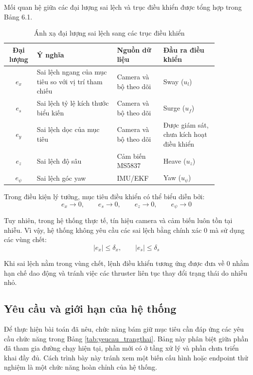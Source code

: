 \documentclass[../DoAn.tex]{subfiles}
\begin{document}
Mối quan hệ giữa các đại lượng sai lệch và trục điều khiển được tổng hợp trong Bảng 6.1.

\begin{table}[htbp]
    \centering
    \caption{Ánh xạ đại lượng sai lệch sang các trục điều khiển}
    \label{tab:anhxa_sailech}
    \renewcommand{\arraystretch}{1.3}
    \begin{tabular}{|c|p{0.38\linewidth}|p{0.22\linewidth}|p{0.26\linewidth}|}
        \hline
        \textbf{Đại lượng} & \textbf{Ý nghĩa} & \textbf{Nguồn dữ liệu} & \textbf{Đầu ra điều khiển} \\
        \hline
        $e_x$ & Sai lệch ngang của mục tiêu so với vị trí tham chiếu & Camera và bộ theo dõi & Sway ($u_l$) \\
        \hline
        $e_s$ & Sai lệch tỷ lệ kích thước biểu kiến & Camera và bộ theo dõi & Surge ($u_f$) \\
        \hline
        $e_y$ & Sai lệch dọc của mục tiêu & Camera và bộ theo dõi & Được giám sát, chưa kích hoạt điều khiển \\
        \hline
        $e_z$ & Sai lệch độ sâu & Cảm biến MS5837 & Heave ($u_z$) \\
        \hline
        $e_\psi$ & Sai lệch góc yaw & IMU/EKF & Yaw ($u_\psi$) \\
        \hline
    \end{tabular}
\end{table}

Trong điều kiện lý tưởng, mục tiêu điều khiển có thể biểu diễn bởi:
\[
e_x \rightarrow 0, \qquad e_s \rightarrow 0, \qquad e_z \rightarrow 0, \qquad e_\psi \rightarrow 0
\]

Tuy nhiên, trong hệ thống thực tế, tín hiệu camera và cảm biến luôn tồn tại nhiễu. Vì vậy, hệ thống không yêu cầu các sai lệch bằng chính xác 0 mà sử dụng các vùng chết:
\[
|e_x| \leq \delta_x, \qquad |e_s| \leq \delta_s
\]

Khi sai lệch nằm trong vùng chết, lệnh điều khiển tương ứng được đưa về 0 nhằm hạn chế dao động và tránh việc các thruster liên tục thay đổi trạng thái do nhiễu nhỏ.

\subsection{Yêu cầu và giới hạn của hệ thống}

Để thực hiện bài toán đã nêu, chức năng bám giữ mục tiêu cần đáp ứng các yêu cầu chức năng trong Bảng \ref{tab:yeucau_trangthai}. Bảng này phân biệt giữa phần đã tham gia đường chạy hiện tại, phần mới có ở tầng xử lý và phần chưa triển khai đầy đủ. Cách trình bày này tránh xem một biến cấu hình hoặc endpoint thử nghiệm là một chức năng hoàn chỉnh của hệ thống.
\end{document}

